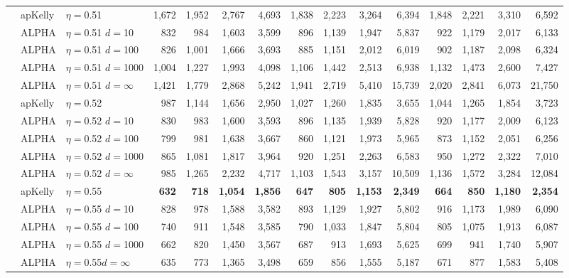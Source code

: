 \documentclass[12pt,runningheads]{llncs}
\begin{document}
{\begin{table}
\begin{tabular}{lll|rrrr|rrrr|rrrr}
\cline{2-15} & apKelly & $\eta=$0.51 & 1,672  & 1,952  & 2,767  & 4,693  & 1,838  & 2,223  & 3,264  & 6,394  & 1,848  & 2,221  & 3,310  & 6,592  \\
& ALPHA & $\eta=$0.51 $d=$10 & 832  & 984  & 1,603  & 3,599  & 896  & 1,139  & 1,947  & 5,837  & 922  & 1,179  & 2,017  & 6,133  \\
& ALPHA & $\eta=$0.51 $d=$100 & 826  & 1,001  & 1,666  & 3,693  & 885  & 1,151  & 2,012  & 6,019  & 902  & 1,187  & 2,098  & 6,324  \\
& ALPHA & $\eta=$0.51 $d=$1000 & 1,004  & 1,227  & 1,993  & 4,098  & 1,106  & 1,442  & 2,513  & 6,938  & 1,132  & 1,473  & 2,600  & 7,427  \\
 & ALPHA & $\eta=$0.51 $d=\infty$  & 1,421  & 1,779  & 2,868  & 5,242  & 1,941  & 2,719  & 5,410  & 15,739  & 2,020  & 2,841  & 6,073  & 21,750  \\
\cline{2-15} & apKelly & $\eta=$0.52 & 987  & 1,144  & 1,656  & 2,950  & 1,027  & 1,260  & 1,835  & 3,655  & 1,044  & 1,265  & 1,854  & 3,723  \\
& ALPHA & $\eta=$0.52 $d=$10 & 830  & 983  & 1,600  & 3,593  & 896  & 1,135  & 1,939  & 5,828  & 920  & 1,177  & 2,009  & 6,123  \\
& ALPHA & $\eta=$0.52 $d=$100 & 799  & 981  & 1,638  & 3,667  & 860  & 1,121  & 1,973  & 5,965  & 873  & 1,152  & 2,051  & 6,256  \\
& ALPHA & $\eta=$0.52 $d=$1000 & 865  & 1,081  & 1,817  & 3,964  & 920  & 1,251  & 2,263  & 6,583  & 950  & 1,272  & 2,322  & 7,010  \\
 & ALPHA & $\eta=$0.52 $d=\infty$ & 985  & 1,265  & 2,232  & 4,717  & 1,103  & 1,543  & 3,157  & 10,509  & 1,136  & 1,572  & 3,284  & 12,084  \\
\cline{2-15} & apKelly & $\eta=$0.55 & \bf{632}  & \bf{718}  & \bf{1,054}  & \bf{1,856}  & \bf{647}  & \bf{805}  & \bf{1,153}  & \bf{2,349}  & \bf{664}  & \bf{850}  & \bf{1,180}  & \bf{2,354} \\
& ALPHA & $\eta=$0.55 $d=$10 & 828  & 978  & 1,588  & 3,582  & 893  & 1,129  & 1,927  & 5,802  & 916  & 1,173  & 1,989  & 6,090  \\
& ALPHA & $\eta=$0.55 $d=$100 & 740  & 911  & 1,548  & 3,585  & 790  & 1,033  & 1,847  & 5,804  & 805  & 1,075  & 1,913  & 6,087  \\
& ALPHA & $\eta=$0.55 $d=$1000 & 662  & 820  & 1,450  & 3,567  & 687  & 913  & 1,693  & 5,625  & 699  & 941  & 1,740  & 5,907  \\
 & ALPHA & $\eta=$0.55$d=\infty$  & 635  & 773  & 1,365  & 3,498  & 659  & 856  & 1,555  & 5,187  & 671  & 877  & 1,583  & 5,408  \\

\end{tabular}
\end{table}}
\end{document}
